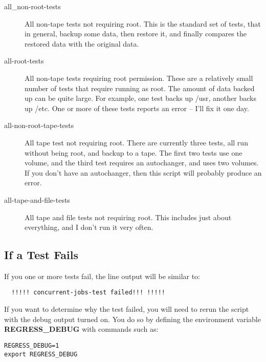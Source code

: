 \begin{description}

\item [all\_non-root-tests]
   All non-tape tests not requiring root.  This is the standard set of tests,
that in general, backup some  data, then restore it, and finally compares the
restored data  with the original data.

\item [all-root-tests]
   All non-tape tests requiring root permission.  These are a relatively small
number of tests that require running  as root. The amount of data backed up
can be quite large. For  example, one test backs up /usr, another backs up
/etc. One  or more of these tests reports an error -- I'll fix it one  day.

\item [all-non-root-tape-tests]
   All tape test not requiring root.  There are currently three tests, all run
without being root,  and backup to a tape. The first two tests use one volume,
and the third test requires an autochanger, and uses two  volumes. If you
don't have an autochanger, then this script  will probably produce an error.

\item [all-tape-and-file-tests]
   All tape and file tests not requiring  root. This includes just about
everything, and I don't run it  very often.
\end{description}

\subsection{If a Test Fails}

If you one or more tests fail, the line output will be similar to:

\footnotesize
\begin{verbatim}
  !!!!! concurrent-jobs-test failed!!! !!!!!
\end{verbatim}
\normalsize

If you want to determine why the test failed, you will need to rerun the
script with the debug output turned on.  You do so by defining the
environment variable {\bf REGRESS\_DEBUG} with commands such as:

\begin{verbatim}
REGRESS_DEBUG=1
export REGRESS_DEBUG
\end{verbatim}

